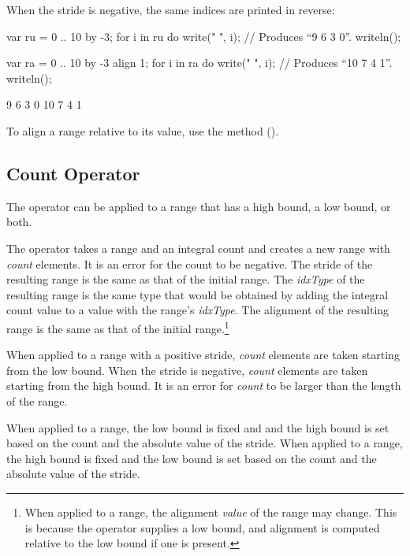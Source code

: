 When the stride is negative, the same indices are printed in reverse:
\begin{example}
\begin{chapelpre}
\end{chapelpre}
\begin{chapel}
var ru = 0 .. 10 by -3;
for i in ru do write(" ", i);		// Produces ``9 6 3 0''.
writeln();

var ra = 0 .. 10 by -3 align 1;
for i in ra do write(" ", i);		// Produces ``10 7 4 1''.
writeln();
\end{chapel}
\begin{chapeloutput}
 9 6 3 0
 10 7 4 1
\end{chapeloutput}
\end{example}

To align a range relative to its  value, use
the  method ().


\subsection{Count Operator}
\label{Count_Operator}

The \chpl{#} operator can be applied to a range that has a high bound,
a low bound, or both.

The \chpl{#} operator takes a range and an integral count and creates a new
range with \emph{count} elements. It is an error for the count to be negative.
The stride of the resulting range is the same as that of the initial
range. The \emph{idxType} of the resulting range is the same type that would be
obtained by adding the integral count value to a value with the
range's \emph{idxType}.  The alignment of the resulting range is the same as
that of the initial range.\footnote{When applied to a  range,
the alignment \emph{value} of the range may change.  This is because
the \chpl{#} operator supplies a low bound, and alignment is computed relative
to the low bound if one is present.}

When applied to a  range with a positive
stride, \emph{count} elements are taken starting from the low
bound. When the stride is negative, \emph{count} elements are taken
starting from the high bound. It is an error for \emph{count} to be larger
than the length of the range.

When applied to a  range, the low bound is
fixed and and the high bound is set based on the count and the absolute value of
the stride.  When applied to a  range, the
high bound is fixed and the low bound is set based on the count and the absolute
value of the stride.


